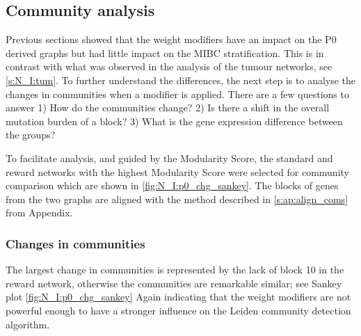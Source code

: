 
\subsection{Community analysis} \label{s:N_I:com_analysis}

Previous sections showed that the weight modifiers have an impact on the P0 derived graphs but had little impact on the MIBC stratification. This is in contrast with what was observed in the analysis of the tumour networks, see \cref{s:N_I:tum}. To further understand the differences, the next step is to analyse the changes in communities when a modifier is applied. There are a few questions to answer 1) How do the communities change? 2) Is there a shift in the overall mutation burden of a block? 3) What is the gene expression difference between the groups? 

To facilitate analysis, and guided by the Modularity Score, the standard and reward networks with the highest Modularity Score were selected for community comparison which are shown in \cref{fig:N_I:p0_chg_sankey}. The blocks of genes from the two graphs are aligned with the method described in \cref{s:ap:align_coms} from Appendix.

\subsubsection*{Changes in communities}

The largest change in communities is represented by the lack of block 10 in the reward network, otherwise the communities are remarkable similar; see  Sankey plot \cref{fig:N_I:p0_chg_sankey} Again indicating that the weight modifiers are not powerful enough to have a stronger influence on the Leiden community detection algorithm. 

